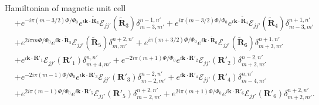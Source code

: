 \documentclass[aspectratio=169,compress,x11names]{beamer}
\begin{document}
\begin{frame}{Hamiltonian of magnetic unit cell}
\begin{equation}
\begin{aligned}
				& + e^{- i\pi(m - 3/2)\Phi/\Phi_{0} } e^{i \mathbf{k} \cdot \tilde{\mathbf{R}}_{3}} \mathcal{E}_{jj'}(\tilde{\mathbf{R}}_{3}) \delta_{m-3,m'}^{n-1,n'} + e^{ i\pi (m-3/2)\Phi/\Phi_{0} } e^{i \mathbf{k} \cdot \tilde{\mathbf{R}}_{4}} \mathcal{E}_{jj'}(\tilde{\mathbf{R}}_{4}) \delta_{m-3,m'}^{n+1,n'} \\
				& + e^{2 i\pi m \Phi/\Phi_{0} } e^{i \mathbf{k} \cdot \tilde{\mathbf{R}}_{5}} \mathcal{E}_{jj'}(\tilde{\mathbf{R}}_{5}) \delta_{m,m'}^{n+2,n'} + e^{ i\pi (m+3/2)\Phi/\Phi_{0} } e^{i \mathbf{k} \cdot \tilde{\mathbf{R}}_{6}} \mathcal{E}_{jj'}(\tilde{\mathbf{R}}_{6})\delta_{m+3,m'}^{n+1,n'} \\
				& + e^{i \mathbf{k} \cdot \mathbf{R}'_{1}} \mathcal{E}_{jj'}(\mathbf{R}'_{1}) \delta_{m+4,m'}^{n,n'} + e^{-2i\pi(m + 1)\Phi / \Phi_{0}} e^{i \mathbf{k} \cdot \mathbf{R}'_{2}} \mathcal{E}_{jj'}(\mathbf{R}'_{2}) \delta_{m+2,m'}^{n-2,n'}  \\
				& + e^{-2i\pi(m - 1)\Phi / \Phi_{0}} e^{i \mathbf{k} \cdot \mathbf{R}'_{3}} \mathcal{E}_{jj'}(\mathbf{R}'_{3}) \delta_{m-2,m'}^{n-2,n'} + e^{i \mathbf{k} \cdot \mathbf{R}'_{4}} \mathcal{E}_{jj'}(\mathbf{R}'_{4}) \delta_{m-4,m'}^{n,n'}                                 \\
				& + e^{2i\pi(m - 1)\Phi / \Phi_{0}} e^{i \mathbf{k} \cdot \mathbf{R}'_{5}} \mathcal{E}_{jj'}(\mathbf{R}'_{5}) \delta_{m-2,m'}^{n+2,n'} + e^{2i\pi(m + 1)\Phi / \Phi_{0}} e^{i \mathbf{k} \cdot \mathbf{R}'_{6}} \mathcal{E}_{jj'}(\mathbf{R}'_{6}) \delta_{m+2,m'}^{n+2,n'}.
			\end{aligned}
		\end{equation}
		
	\end{frame}
\end{document}
